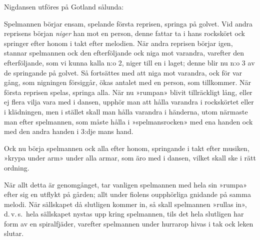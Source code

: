 {
\vspace{0.7cm}
\setlength{\parindent}{1.5em}
Nigdansen utföres på Gotland sålunda:\smallskip{}

Spelmannen börjar ensam, spelande första reprisen, springa på golvet.
Vid andra reprisens början \textit{niger} han mot en person, denne
fattar ta i hans rockskört ock springer efter honom i takt efter melodien.
När andra reprisen börjar igen, stannar spelmannen ock den efterföljande
ock niga mot varandra, varefter den efterföljande, som vi kunna kalla
n:o 2, niger till en i laget; denne blir nu n:o 3 av de springande
på golvet. Så fortsättes med att niga mot varandra, ock för var gång,
som nigningen försiggår, ökas antalet med en person, som tillkommer.
När första reprisen spelas, springa alla. När nu »rumpan» blivit tillräckligt
lång, eller ej flera vilja vara med i dansen, upphör man att hålla
varandra i rockskörtet eller i klädningen, men i stället skall man
hålla varandra i händerna, utom närmaste man efter spelmannen, som
måste hålla i »spelmansrocken» med ena handen ock med den andra handen
i 3:dje mans hand.

Ock nu börja spelmannen ock alla efter honom, springande i takt efter
musiken, »krypa under arm» under alla armar, som äro med i dansen,
vilket skall ske i rätt ordning.

När allt detta är genomgånget, tar vanligen spelmannen med hela sin
»rumpa» efter sig en utflykt på gården; allt under fiolens oupphörliga
gnidande på samma melodi. När sällskapet då slutligen kommer in, så
skall spelmannen »rullas in», d.\,v.\,s.\ hela sällskapet nystas
upp kring spelmannen, tils det hela slutligen har form av en spiralfjäder,
varefter spelmannen under hurrarop hivas i tak ock leken slutar.
\vspace{0.3cm}
}

